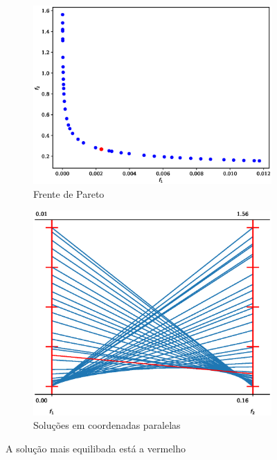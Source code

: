 \documentclass[a4paper,12pt]{article}
\begin{document}
\begin{figure}[!htbp]
\centering
\begin{subfigure}{.5\textwidth}
  \centering
  \includegraphics[width=.99\linewidth]{objSpace.eps}
  \caption{Frente de Pareto}
  \label{fig:sub1}
\end{subfigure}%
\begin{subfigure}{.5\textwidth}
  \centering
  \includegraphics[width=.99\linewidth]{parallel_coord.eps}
  \caption{Soluções em coordenadas paralelas}
  \label{fig:sub2}
\end{subfigure}
\caption{\label{fig:defIm2}A solução mais equilibada está a vermelho}
\end{figure}
\end{document}
